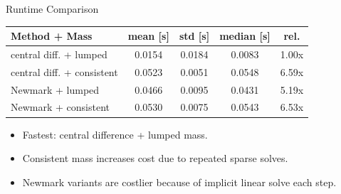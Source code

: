 \documentclass{beamer}
\begin{document}
\begin{frame}{Runtime Comparison}
  \begin{table}
    \centering
    \footnotesize
    \begin{tabular}{@{}lcccc@{}}
      \toprule
      Method + Mass & mean [s] & std [s] & median [s] & rel. \\
      \midrule
      central diff. + lumped     & 0.0154 & 0.0184 & 0.0083 & 1.00x \\
      central diff. + consistent & 0.0523 & 0.0051 & 0.0548 & 6.59x \\
      Newmark + lumped           & 0.0466 & 0.0095 & 0.0431 & 5.19x \\
      Newmark + consistent       & 0.0530 & 0.0075 & 0.0543 & 6.53x \\
      \bottomrule
    \end{tabular}
  \end{table}

  \begin{itemize}
    \item Fastest: central difference + lumped mass.
    \item Consistent mass increases cost due to repeated sparse solves.
    \item Newmark variants are costlier because of implicit linear solve each step.
  \end{itemize}
\end{frame}
\end{document}
